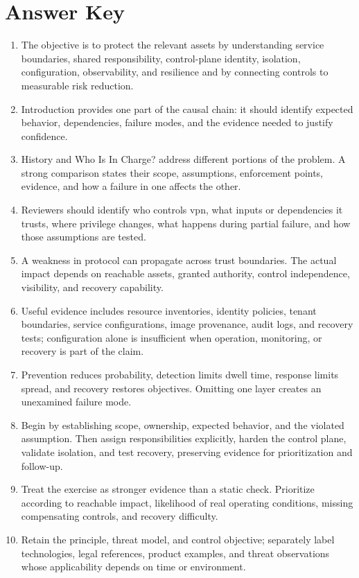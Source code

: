 \documentclass[11pt]{article}
\begin{document}
\section*{Answer Key}
\begin{enumerate}
\item The objective is to protect the relevant assets by understanding service boundaries, shared responsibility, control-plane identity, isolation, configuration, observability, and resilience and by connecting controls to measurable risk reduction.
\item Introduction provides one part of the causal chain: it should identify expected behavior, dependencies, failure modes, and the evidence needed to justify confidence.
\item History and Who Is In Charge? address different portions of the problem. A strong comparison states their scope, assumptions, enforcement points, evidence, and how a failure in one affects the other.
\item Reviewers should identify who controls vpn, what inputs or dependencies it trusts, where privilege changes, what happens during partial failure, and how those assumptions are tested.
\item A weakness in protocol can propagate across trust boundaries. The actual impact depends on reachable assets, granted authority, control independence, visibility, and recovery capability.
\item Useful evidence includes resource inventories, identity policies, tenant boundaries, service configurations, image provenance, audit logs, and recovery tests; configuration alone is insufficient when operation, monitoring, or recovery is part of the claim.
\item Prevention reduces probability, detection limits dwell time, response limits spread, and recovery restores objectives. Omitting one layer creates an unexamined failure mode.
\item Begin by establishing scope, ownership, expected behavior, and the violated assumption. Then assign responsibilities explicitly, harden the control plane, validate isolation, and test recovery, preserving evidence for prioritization and follow-up.
\item Treat the exercise as stronger evidence than a static check. Prioritize according to reachable impact, likelihood of real operating conditions, missing compensating controls, and recovery difficulty.
\item Retain the principle, threat model, and control objective; separately label technologies, legal references, product examples, and threat observations whose applicability depends on time or environment.
\end{enumerate}
\end{document}
